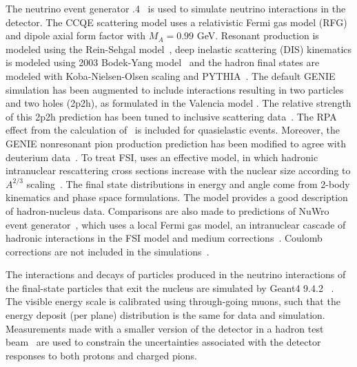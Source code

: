 The neutrino event generator .4~\cite{Andreopoulos:2009rq} is used to simulate neutrino interactions in the detector. The CCQE scattering model uses a relativistic Fermi gas model (RFG) and dipole axial form factor with $M_A=0.99$ GeV. Resonant production is modeled using the Rein-Sehgal model~\cite{Rein:1980wg}, deep inelastic scattering (DIS) kinematics is modeled using 2003 Bodek-Yang model~\cite{Bodek:2002ps} and the hadron final states are modeled with Koba-Nielsen-Olsen scaling and PYTHIA~\cite{koba,pythia}. The default GENIE simulation has been augmented to include interactions resulting in two particles and two holes (2p2h), as formulated in the Valencia model \cite{Nieves:2011yp,Gran:2013kda,Schwehr:2016pvn}. The relative strength of this 2p2h prediction has been tuned to \minerva inclusive scattering data~\cite{Rodrigues:2015hik}. The RPA effect from the calculation of~\cite{Nieves:2004wx} is included for quasielastic events. Moreover, the GENIE nonresonant pion production prediction has been modified to agree with deuterium data~\cite{Wilkinson:2014yfa}. To treat FSI, \genie uses an effective model, in which hadronic intranuclear rescattering cross sections increase with the nuclear size according to $A^{2/3}$ scaling~\cite{Dytman:2011zz}. The final state distributions in energy and angle come from 2-body kinematics and phase space formulations.  The model provides a good description of hadron-nucleus data. Comparisons are also made to predictions of NuWro event generator~\cite{Golan:2012wx}, which uses a local Fermi gas model, an intranuclear cascade of hadronic interactions in the FSI model and medium corrections~\cite{Salcedo:1987md}. Coulomb corrections are not included in the simulations~\cite{Coulomb}.

 The interactions and decays of particles produced in the neutrino interactions of the final-state particles that exit the nucleus are simulated by Geant4 9.4.2 ~\cite{Agostinelli:2002hh}. The visible energy scale is calibrated using through-going muons, such that the energy deposit (per plane) distribution is the same for data and simulation.  Measurements made with a smaller version of the \minerva detector in a
hadron test beam~\cite{Aliaga:2013uqz} are used to constrain the
uncertainties associated with the detector responses to both protons and charged pions.  
